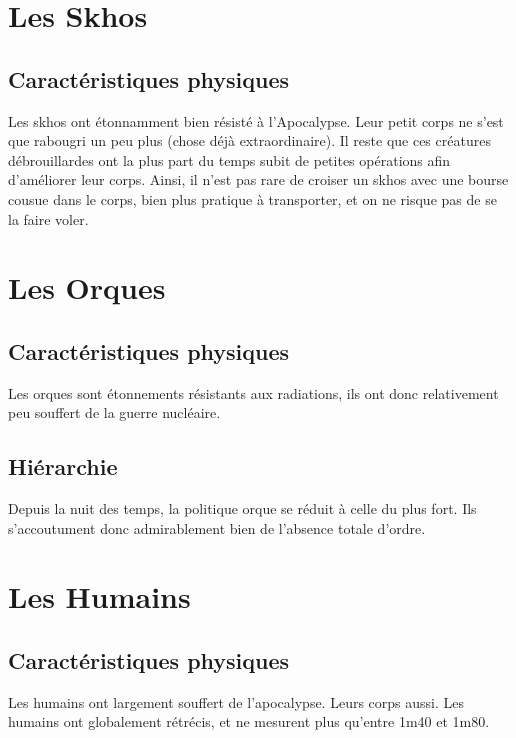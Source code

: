 \section{Les Skhos}
\subsection{Caractéristiques physiques}
Les skhos ont étonnamment bien résisté à l'Apocalypse. Leur petit corps ne s'est que rabougri un peu plus (chose déjà extraordinaire). Il reste que ces créatures débrouillardes ont la plus part du temps subit de petites opérations afin d'améliorer leur corps. Ainsi, il n'est pas rare de croiser un skhos avec une bourse cousue dans le corps, bien plus pratique à transporter, et on ne risque pas de se la faire voler. 
\section{Les Orques}
\subsection{Caractéristiques physiques}
Les orques sont étonnements résistants aux radiations, ils ont donc relativement peu souffert de la guerre nucléaire.
\subsection{Hiérarchie}
Depuis la  nuit des temps, la politique orque se réduit à celle du plus fort. Ils s'accoutument donc admirablement bien de l'absence totale d'ordre.
\section{Les Humains}
\subsection{Caractéristiques physiques}
Les humains ont largement souffert de l'apocalypse. Leurs corps aussi. Les humains ont globalement rétrécis, et ne mesurent plus qu'entre 1m40 et 1m80.